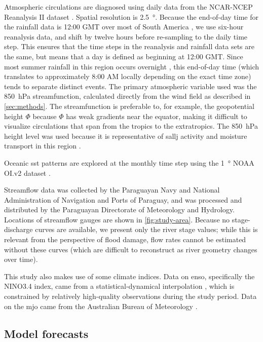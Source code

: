 \documentclass{ametsoc}
\begin{document}
Atmospheric circulations are diagnosed using daily data from the NCAR-NCEP Reanalysis II dataset \citep{Kanamitsu2002}.
Spatial resolution is \SI{2.5}{\degree}.
Because the end-of-day time for the rainfall data is 12:00 GMT over most of South America \citep{Chen2008}, we use six-hour reanalysis data, and shift by twelve hours before re-sampling to the daily time step.
This ensures that the time steps in the reanalysis and rainfall data sets are the same, but means that a day is defined as beginning at 12:00 GMT.
Since most summer rainfall in this region occurs overnight \citep{Vera2006,Salio2007}, this end-of-day time (which translates to approximately 8:00 AM locally depending on the exact time zone) tends to separate distinct events.
The primary atmospheric variable  used was the \SI{850}{\hecto\pascal} streamfunction, calculated directly from the wind field as described in \cref{sec:methods}.
The streamfunction is preferable to, for example, the geopotential height $\Phi$ because $\Phi$ has weak gradients near the equator, making it difficult to visualize circulations that span from the tropics to the extratropics.
The \SI{850}{\hecto\pascal} height level was used because it is representative of \gls{sallj} activity and moisture transport in this region \citep{Marengo2004,Salio2007}.

Oceanic \gls{sst} patterns are explored at the monthly time step using the \SI{1}{\degree} NOAA OI.v2 dataset \citep{Reynolds2002}.

Streamflow data was collected by the Paraguayan Navy and National Administration of Navigation and Ports of Paraguay, and was processed and distributed by the Paraguayan Directorate of Meteorology and Hydrology.
Locations of streamflow gauges are shown in \cref{fig:study-area}.
Because no stage-discharge curves are available, we present only the river stage values; while this is relevant from the perspective of flood damage, flow rates cannot be estimated without these curves (which are difficult to reconstruct as river geometry changes over time).

This study also makes use of some climate indices.
Data on \gls{enso}, specifically the NINO3.4 index, came from a statistical-dynamical interpolation \citep{Kaplan1998}, which is constrained by relatively high-quality observations during the study period.
Data on the \gls{mjo}   came from the Australian Bureau of Meteorology \citep{Wheeler2004}.

\subsection{Model forecasts}
\end{document}
